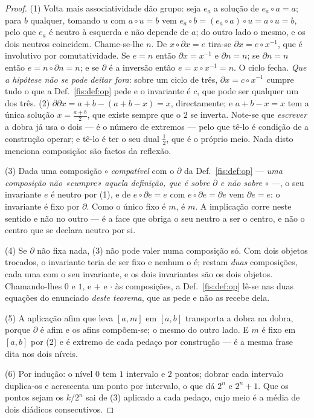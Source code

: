 \documentclass[livro.tex]{subfiles}
\begin{document}
\begin{proof}
(1) Volta mais associatividade dão grupo: seja $e_a$ a solução de
$e_a\circ a=a$; para $b$ qualquer, tomando $u$ com $a\circ u=b$ vem
$e_a\circ b=(e_a\circ a)\circ u=a\circ u=b$, pelo que $e_a$ é neutro à esquerda e
não depende de $a$; do outro lado o mesmo, e os dois neutros coincidem.
Chame-se-lhe $n$. De $x\circ\partial x=e$ tira-se $\partial x=e\circ x^{-1}$, que
é involutivo por comutatividade. Se $e=n$ então $\partial x=x^{-1}$ e
$\partial n=n$; se $\partial n=n$ então $e=n\circ\partial n=n$; e se $\partial$ é
a inversão então $e=x\circ x^{-1}=n$. O ciclo fecha. \emph{Que a hipótese não se
pode deitar fora}: sobre um ciclo de três, $\partial x=c\circ x^{-1}$ cumpre tudo
o que a Def.~\ref{fis:def:op} pede e o invariante é $c$, que pode ser qualquer um
dos três.
(2) $\partial\partial x=a+b-(a+b-x)=x$, directamente; e $a+b-x=x$ tem a única
solução $x=\tfrac{a+b}{2}$, que existe sempre que o $2$ se inverta. Note-se que
\emph{escrever} a dobra já usa o dois --- é o número de extremos --- pelo que
tê-lo é condição de a construção operar; e tê-lo é ter o seu dual $\tfrac12$,
que é o próprio meio. Nada disto menciona composição: são factos da reflexão.

(3) Dada uma composição $\circ$ \emph{compatível} com o $\partial$ da
Def.~\ref{fis:def:op} --- \emph{uma composição não «cumpre» aquela definição, que
é sobre $\partial$ e não sobre $\circ$} ---, o seu
invariante $e$ é neutro por (1), e de $e\circ\partial e=e$ com
$e\circ\partial e=\partial e$ vem $\partial e=e$: o invariante é fixo por
$\partial$. Como o único fixo é $m$, é $m$. A implicação corre neste sentido e
não no outro --- é a face que obriga o seu neutro a ser o centro, e não o centro
que se declara neutro por si.

(4) Se $\partial$ não fixa nada, (3) não pode valer numa composição só. Com dois
objetos trocados, o invariante teria de ser fixo e nenhum o é; restam
\emph{duas} composições, cada uma com o seu invariante, e os dois invariantes são
os dois objetos. Chamando-lhes $0$ e $1$, e $+$ e $\cdot$ às composições, a
Def.~\ref{fis:def:op} lê-se nas duas equações do enunciado \emph{deste teorema},
que as pede e não as recebe dela.

(5) A aplicação afim que leva $[a,m]$ em $[a,b]$ transporta a dobra na dobra,
porque $\partial$ é afim e os afins compõem-se; o mesmo do outro lado. E $m$ é
fixo em $[a,b]$ por (2) e é extremo de cada pedaço por construção --- é a mesma
frase dita nos dois níveis.

(6) Por indução: o nível $0$ tem $1$ intervalo e $2$ pontos; dobrar cada
intervalo duplica-os e acrescenta um ponto por intervalo, o que dá $2^{n}$ e
$2^{n}+1$. Que os pontos sejam os $k/2^{n}$ sai de (3) aplicado a cada pedaço,
cujo meio é a média de dois diádicos consecutivos.
\end{proof}
\end{document}
